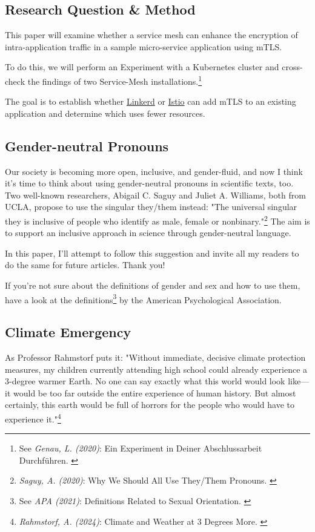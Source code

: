 \subsection{Research Question \& Method}

This paper will examine whether a service mesh can enhance the encryption of intra-application traffic in a sample micro-service application using mTLS.

To do this, we will perform an Experiment with a Kubernetes cluster and cross-check the findings of two Service-Mesh installations.\footnote{See \textit{Genau, L. (2020)}: Ein Experiment in Deiner Abschlussarbeit Durchführen. \cite{expScribbr}}

The goal is to establish whether \href{https://linkerd.io/}{Linkerd} or \href{https://istio.io/}{Istio} can add mTLS to an existing application and determine which uses fewer resources.

\subsection{Gender-neutral Pronouns}

Our society is becoming more open, inclusive, and gender-fluid, and now I think it's time to think about using gender-neutral pronouns in scientific texts, too. Two well-known researchers, Abigail C. Saguy and Juliet A. Williams, both from UCLA, propose to use the singular they/them instead: "The universal singular they is inclusive of people who identify as male, female or nonbinary."\footnote{\textit{Saguy, A. (2020)}: Why We Should All Use They/Them Pronouns. \cite{pronouns}} The aim is to support an inclusive approach in science through gender-neutral language. 

In this paper, I'll attempt to follow this suggestion and invite all my readers to do the same for future articles. Thank you!

If you're not sure about the definitions of gender and sex and how to use them, have a look at the definitions\footnote{See \textit{APA (2021)}: Definitions Related to Sexual Orientation. \cite{apaDefinitions}} by the American Psychological Association.

\subsection{Climate Emergency}

As Professor Rahmstorf puts it: "Without immediate, decisive climate protection measures, my children currently attending high school could already experience a 3-degree warmer Earth. No one can say exactly what this world would look like—it would be too far outside the entire experience of human history. But almost certainly, this earth would be full of horrors for the people who would have to experience it."\footnote{\textit{Rahmstorf, A. (2024)}: Climate and Weather at 3 Degrees More. \cite{3dgreesMore}}
